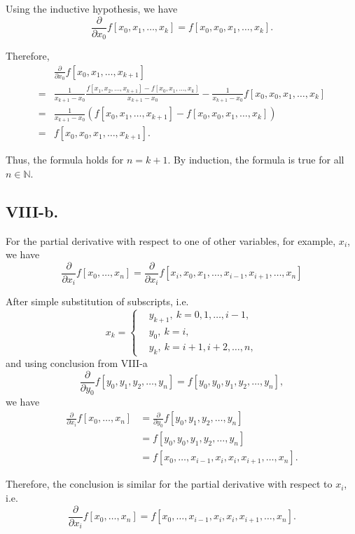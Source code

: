 \documentclass[a4paper]{article}
\begin{document}
Using the inductive hypothesis, we have
$$
\frac{\partial}{\partial x_0} f[x_0, x_1, \dots, x_k] = f[x_0, x_0, x_1, \dots, x_k].
$$

Therefore,
$$
\begin{aligned}
  &\frac{\partial}{\partial x_0} f[x_0, x_1, \dots, x_{k+1}]\\
  =& \frac{1}{x_{k+1}-x_0} \frac{f[x_1, x_2, \dots, x_{k+1}] - f[x_0, x_1, \dots, x_{k}]}{x_{k+1}-x_0} - \frac{1}{x_{k+1}-x_0} f[x_0, x_0, x_1, \dots, x_k]\\
  =& \frac{1}{x_{k+1}-x_0} (f[x_0, x_1, \dots, x_{k+1}] - f[x_0, x_0, x_1, \dots, x_k])\\
  =& f[x_0, x_0, x_1, \dots, x_{k+1}].
\end{aligned}
$$

Thus, the formula holds for $n = k + 1$. By induction, the formula is true for all $n \in \mathbb{N}$.


\subsection*{VIII-b.}
For the partial derivative with respect to one of other variables, for example, $x_i$, we have
$$
  \frac{\partial}{\partial x_i} f[x_0, \dots, x_n] = \frac{\partial}{\partial x_i} f[x_i, x_0, x_1, \dots, x_{i-1}, x_{i+1}, \dots, x_n]
$$

After simple substitution of subscripts, i.e.
$$
  x_{k}=\left\{\begin{aligned}
  &y_{k+1},\ k=0,1,\ldots,i-1,\\
  &y_0,\ k=i,\\
  &y_{k},\ k=i+1,i+2,\ldots,n,
\end{aligned}\right.
$$
and using conclusion from VIII-a
$$
  \frac{\partial}{\partial y_0} f[y_0, y_1, y_2, \dots, y_n]=f[y_0, y_0, y_1, y_2, \dots, y_n],
$$
we have
$$
\begin{aligned}
  \frac{\partial}{\partial x_i} f[x_0, \dots, x_n] &= \frac{\partial}{\partial y_0} f[y_0, y_1, y_2, \dots, y_n]  \\
  &=f[y_0, y_0, y_1, y_2, \dots, y_n]\\
  &=f[x_0, \dots, x_{i-1}, x_i, x_i, x_{i+1}, \dots, x_n].
\end{aligned}
$$

Therefore, the conclusion is similar for the partial derivative with respect to $x_i$, i.e.
$$
\frac{\partial}{\partial x_i} f[x_0, \dots, x_n] = f[x_0, \dots, x_{i-1}, x_i, x_i, x_{i+1}, \dots, x_n].
$$
\end{document}
